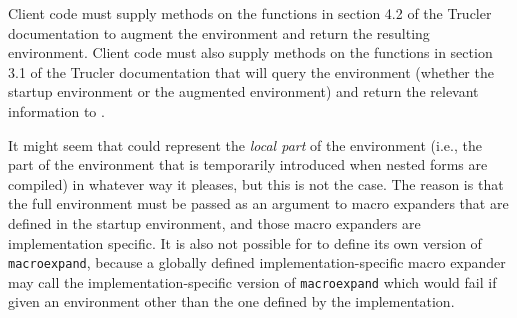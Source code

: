 Client code must supply methods on the functions in section 4.2 of the
Trucler documentation to augment the environment and return the
resulting environment.  Client code must also supply methods on the
functions in section 3.1 of the Trucler documentation that will query
the environment (whether the startup environment or the augmented
environment) and return the relevant information to \sysname{}.

It might seem that \sysname{} could represent the \emph{local part} of
the environment (i.e., the part of the environment that is temporarily
introduced when nested forms are compiled) in whatever way it pleases,
but this is not the case.  The reason is that the full environment
must be passed as an argument to macro expanders that are defined in
the startup environment, and those macro expanders are implementation
specific.  It is also not possible for \sysname{} to define its own
version of \texttt{macroexpand}, because a globally defined
implementation-specific macro expander may call the
implementation-specific version of \texttt{macroexpand} which would
fail if given an environment other than the one defined by the
implementation. 
